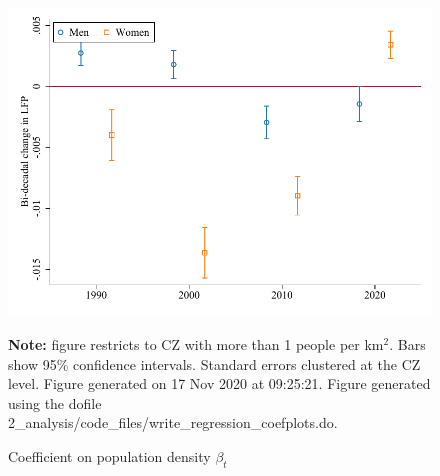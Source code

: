 \begin{figure}[!h]
\centering
\caption{Coefficient on population density $ \beta_t $}
\includegraphics[width=1\textwidth]{../2_analysis/output/figures/d_lfp_gender_full_time}
\par \begin{minipage}[h]{\textwidth}{\tiny\textbf{Note:} figure restricts to CZ with more than 1 people per km$^2$. Bars show 95\% confidence intervals. Standard errors clustered at the CZ level. Figure generated on 17 Nov 2020 at 09:25:21. Figure generated using the dofile 2\_analysis/code\_files/write\_regression\_coefplots.do.}\end{minipage}
\end{figure}
